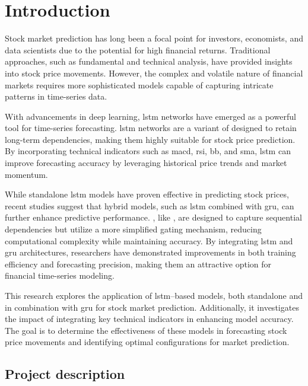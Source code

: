 \clearpage
\pagestyle{plain}

\section{Introduction}

Stock market prediction has long been a focal point for investors, economists, and
data scientists due to the potential for high financial returns. Traditional
approaches, such as fundamental and technical analysis, have provided insights into
stock price movements. However, the complex and volatile nature of financial markets
requires more sophisticated models capable of capturing intricate patterns in 
time-series data.

With advancements in deep learning, \acrfull{lstm} networks have emerged as a 
powerful tool for time-series forecasting. \acrshort{lstm} networks are a variant 
of  designed to retain long-term dependencies, making them highly
suitable for stock price prediction. By incorporating technical indicators such as
\acrfull{macd}, \acrfull{rsi}, \acrfull{bb}, and \acrfull{sma}, \acrshort{lstm}
can improve forecasting accuracy by leveraging historical price trends and market
momentum.

While standalone \acrshort{lstm} models have proven effective in predicting stock
prices, recent studies suggest that hybrid models, such as \acrshort{lstm} combined
with \acrfull{gru}, can further enhance predictive performance. , like
, are designed to capture sequential dependencies but utilize a more
simplified gating mechanism, reducing computational complexity while maintaining
accuracy. By integrating \acrshort{lstm} and \acrshort{gru} architectures, researchers
have demonstrated improvements in both training efficiency and forecasting precision,
making them an attractive option for financial time-series modeling.

This research explores the application of \acrshort{lstm}--based models, both
standalone and in combination with \acrshort{gru} for stock market prediction.
Additionally, it investigates the impact of integrating key technical indicators in
enhancing model accuracy. The goal is to determine the effectiveness of these models
in forecasting stock price movements and identifying optimal configurations for 
market prediction.

\subsection{Project description}

